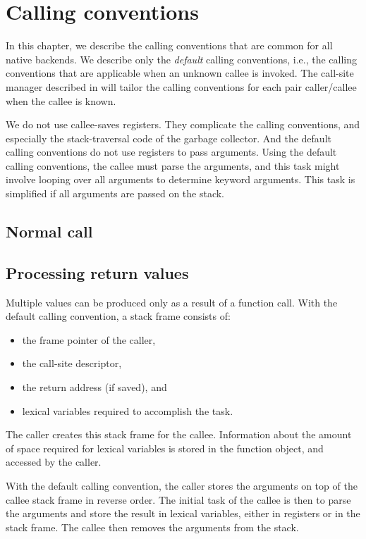 \chapter{Calling conventions}

In this chapter, we describe the \sysname{} calling conventions that
are common for all native backends.  We describe only the
\emph{default} calling conventions, i.e., the calling conventions that
are applicable when an unknown callee is invoked.  The call-site
manager described in  will tailor the
calling conventions for each pair caller/callee when the callee is
known. 

We do not use callee-saves registers.  They complicate the calling
conventions, and especially the stack-traversal code of the garbage
collector.  And the default calling conventions do not use registers
to pass arguments.  Using the default calling conventions, the callee
must parse the arguments, and this task might involve looping over all
arguments to determine keyword arguments.  This task is simplified if
all arguments are passed on the stack.

\section{Normal call}



\section{Processing return values}

Multiple values can be produced only as a result of a function call.
With the default calling convention, a stack frame consists of:

\begin{itemize}
\item the frame pointer of the caller,
\item the call-site descriptor,
\item the return address (if saved), and
\item lexical variables required to accomplish the task.
\end{itemize}

The caller creates this stack frame for the callee.  Information about
the amount of space required for lexical variables is stored in the
function object, and accessed by the caller.

With the default calling convention, the caller stores the arguments
on top of the callee stack frame in reverse order.  The initial task
of the callee is then to parse the arguments and store the result in
lexical variables, either in registers or in the stack frame.  The
callee then removes the arguments from the stack.

